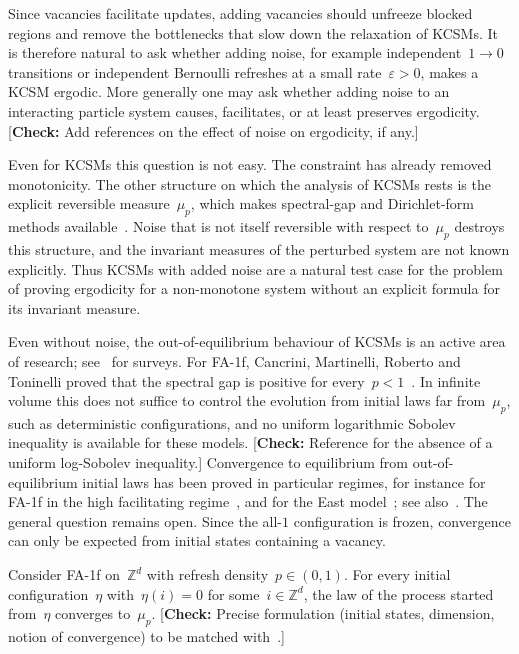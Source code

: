 \documentclass[EJP,preprint,NODS,nobera]{ejpecp}
\newcommand{\Z}{\mathbb{Z}}
\newcommand{\authorcheck}[1]{{\color{blue}[\textbf{Check:} #1]}}
\begin{document}
Since vacancies facilitate updates, adding vacancies should unfreeze
blocked regions and remove the bottlenecks that slow down the relaxation of
KCSMs. It is therefore natural to ask whether adding noise, for example
independent~$1\to0$ transitions or independent Bernoulli refreshes at a small
rate~$\varepsilon>0$, makes a KCSM ergodic. More generally one may ask
whether adding noise to an interacting particle system causes, facilitates,
or at least preserves ergodicity.
\authorcheck{Add references on the effect of noise on ergodicity, if any.}

Even for KCSMs this question is not easy. The constraint has already removed
monotonicity. The other structure on which the analysis of KCSMs rests is the
explicit reversible measure~$\mu_p$, which makes spectral-gap and
Dirichlet-form methods available~\cite{CancriniEtAl2008}. Noise that is not
itself reversible with respect to~$\mu_p$ destroys this structure, and the
invariant measures of the perturbed system are not known explicitly. Thus
KCSMs with added noise are a natural test case for the problem of proving
ergodicity for a non-monotone system without an explicit formula for its
invariant measure.

Even without noise, the out-of-equilibrium behaviour of KCSMs is an active
area of research; see~\cite{HartarskyToninelli2024,MartinelliShapiraToninelli2025}
for surveys. For FA-1f, Cancrini, Martinelli, Roberto and Toninelli proved
that the spectral gap is positive for every~$p<1$~\cite{CancriniEtAl2008}.
In infinite volume this does not suffice to control the evolution from
initial laws far from~$\mu_p$, such as deterministic configurations, and no
uniform logarithmic Sobolev inequality is available for these models.
\authorcheck{Reference for the absence of a uniform log-Sobolev inequality.}
Convergence to equilibrium from out-of-equilibrium initial laws has been
proved in particular regimes, for instance for FA-1f in the high facilitating
regime~\cite{BlondelEtAl2013}, and for the East
model~\cite{CancriniEtAl2010,Mareche2019}; see
also~\cite{MountfordValle2019,HartarskyToninelli2024,MartinelliShapiraToninelli2025}.
The general question remains open. Since the all-$1$ configuration is frozen,
convergence can only be expected from initial states containing a vacancy.

\begin{conjecture}
\label{conj:fa1f}
Consider FA-1f on~$\Z^d$ with refresh density~$p\in(0,1)$. For every initial
configuration~$\eta$ with~$\eta(i)=0$ for some~$i\in\Z^d$, the law of the
process started from~$\eta$ converges to~$\mu_p$.
\authorcheck{Precise formulation (initial states, dimension, notion of
convergence) to be matched with~\cite{MartinelliShapiraToninelli2025}.}
\end{conjecture}
\end{document}
